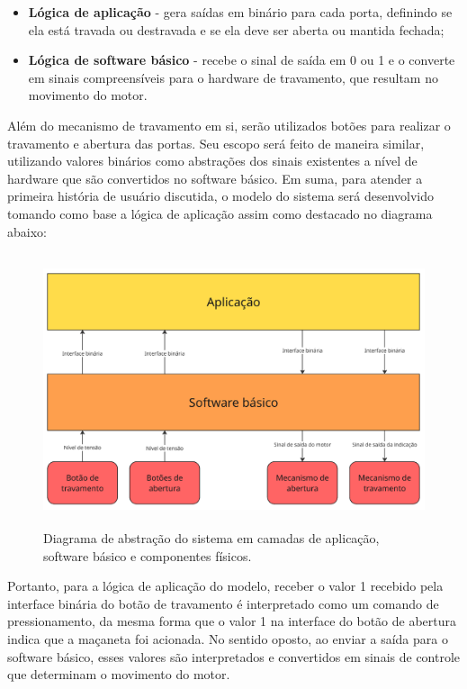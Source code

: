 \begin{itemize}
    \item \textbf{Lógica de aplicação} - gera saídas em binário para cada porta, definindo se ela está travada ou destravada e se ela deve ser aberta ou mantida fechada;
    \item \textbf{Lógica de software básico} - recebe o sinal de saída em 0 ou 1 e o converte em sinais compreensíveis para o hardware de travamento, que resultam no movimento do motor.
\end{itemize}

Além do mecanismo de travamento em si, serão utilizados botões para realizar o travamento e abertura das portas. Seu escopo será feito de maneira similar, utilizando 
valores binários como abstrações dos sinais existentes a nível de hardware que são convertidos no software básico. Em suma, para atender a primeira história de 
usuário discutida, o modelo do sistema será desenvolvido tomando como base a lógica de aplicação assim como destacado no diagrama abaixo:

\begin{figure}[H]
\centering
\includegraphics[height=8cm]{figuras/diagrama_aplication.png}
\caption{Diagrama de abstração do sistema em camadas de aplicação, software básico e componentes físicos.}
\end{figure}

Portanto, para a lógica de aplicação do modelo, receber o valor 1 recebido pela interface binária do botão de travamento é interpretado como um comando de 
pressionamento, da mesma forma que o valor 1 na interface do botão de abertura indica que a maçaneta foi acionada. No sentido oposto, ao enviar a saída para 
o software básico, esses valores são interpretados e convertidos em sinais de controle que determinam o movimento do motor.

